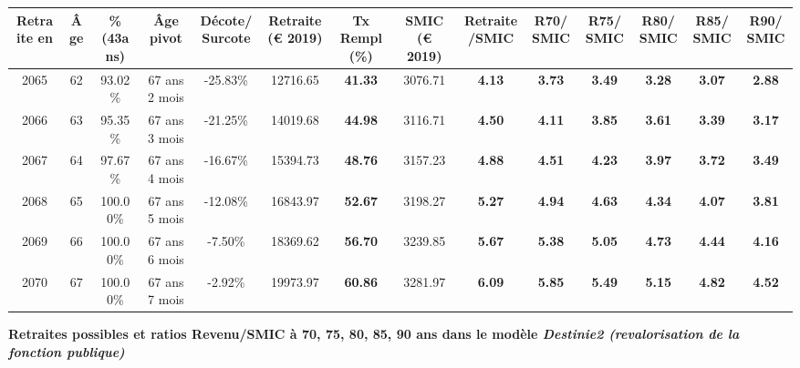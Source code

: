 \begin{adjustbox}{max width=\textwidth} 
\begin{tabular}[htb]{|c|c||c|c|c||c|c||c|c||c|c|c|c|c|} 
\hline 
 Retraite en &  Âge &  \%(43ans) &  Âge pivot &  Décote/Surcote &  Retraite (\euro{} 2019) &  Tx Rempl(\%) &  SMIC (\euro{} 2019) &  Retraite/SMIC &  R70/SMIC &  R75/SMIC &  R80/SMIC &  R85/SMIC &  R90/SMIC \\ 
\hline \hline 
 2065 &  62 &  93.02\% &  67 ans 2 mois &  -25.83\% &  12716.65 &  {\bf 41.33} &  3076.71 &  {\bf 4.13} &  {\bf 3.73} &  {\bf 3.49} &  {\bf 3.28} &  {\bf 3.07} &  {\bf 2.88} \\ 
\hline 
 2066 &  63 &  95.35\% &  67 ans 3 mois &  -21.25\% &  14019.68 &  {\bf 44.98} &  3116.71 &  {\bf 4.50} &  {\bf 4.11} &  {\bf 3.85} &  {\bf 3.61} &  {\bf 3.39} &  {\bf 3.17} \\ 
\hline 
 2067 &  64 &  97.67\% &  67 ans 4 mois &  -16.67\% &  15394.73 &  {\bf 48.76} &  3157.23 &  {\bf 4.88} &  {\bf 4.51} &  {\bf 4.23} &  {\bf 3.97} &  {\bf 3.72} &  {\bf 3.49} \\ 
\hline 
 2068 &  65 &  100.00\% &  67 ans 5 mois &  -12.08\% &  16843.97 &  {\bf 52.67} &  3198.27 &  {\bf 5.27} &  {\bf 4.94} &  {\bf 4.63} &  {\bf 4.34} &  {\bf 4.07} &  {\bf 3.81} \\ 
\hline 
 2069 &  66 &  100.00\% &  67 ans 6 mois &  -7.50\% &  18369.62 &  {\bf 56.70} &  3239.85 &  {\bf 5.67} &  {\bf 5.38} &  {\bf 5.05} &  {\bf 4.73} &  {\bf 4.44} &  {\bf 4.16} \\ 
\hline 
 2070 &  67 &  100.00\% &  67 ans 7 mois &  -2.92\% &  19973.97 &  {\bf 60.86} &  3281.97 &  {\bf 6.09} &  {\bf 5.85} &  {\bf 5.49} &  {\bf 5.15} &  {\bf 4.82} &  {\bf 4.52} \\ 
\hline 
\hline 
\end{tabular} 
\end{adjustbox} 
 
 \vspace{0.1cm} 
{\bf \noindent Retraites possibles et ratios Revenu/SMIC à 70, 75, 80, 85, 90 ans dans le modèle \emph{Destinie2 (revalorisation de la fonction publique)}}  
 
